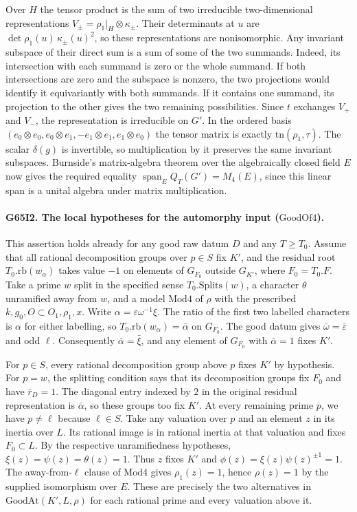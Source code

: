 Over $H$ the tensor product is the sum of two irreducible
two-dimensional representations $V_\pm=\rho_1|_H\otimes\kappa_\pm$.
Their determinants at $u$ are $\det\rho_1(u)\,\kappa_\pm(u)^2$,
so these representations are nonisomorphic. Any invariant subspace of
their direct sum is a sum of some of the two summands. Indeed, its
intersection with each summand is zero or the whole summand. If both
intersections are zero and the subspace is nonzero, the two projections
would identify it equivariantly with both summands. If it contains one
summand, its projection to the other gives the two remaining possibilities.
Since $t$ exchanges $V_+$ and $V_-$, the representation is irreducible
on $G'$. In the ordered basis
$(e_0\otimes e_0,e_0\otimes e_1,-e_1\otimes e_1,e_1\otimes e_0)$
the tensor matrix is exactly $\mathrm{tn}(\rho_1,\tau)$. The scalar
$\delta(g)$ is invertible, so multiplication by it preserves the same
invariant subspaces. Burnside's matrix-algebra theorem over the
algebraically closed field $E$ now gives the required equality
$\operatorname{span}_E Q_T(G')=M_4(E)$, since this linear span is a
unital algebra under matrix multiplication.

\paragraph{G65I2. The local hypotheses for the automorphy input ($\mathrm{GoodOf4}$).}
This assertion holds already for any good raw datum $D$ and any
$T\ge T_0$. Assume that all rational decomposition
groups over $p\in S$ fix $K'$, and the residual root $T_0.\mathrm{rb}(w_\alpha)$
takes value $-1$ on elements of $G_{F_0}$ outside $G_{K'}$,
where $F_0=T_0.F$. Take a prime $w$ split in the specified sense
$T_0.\mathrm{Splits}(w)$, a character $\theta$ unramified away from
$w$, and a model $\mathrm{Mod4}$ of $\rho$ with the prescribed
$k,g_0,O\subset O_1,\rho_1,x$. Write
$\alpha=\varepsilon\omega^{-1}\xi$. The ratio of the first two
labelled characters is $\alpha$ for either labelling, so
$T_0.\mathrm{rb}(w_\alpha)=\bar\alpha$ on $G_{F_0}$.
The good datum gives $\bar\omega=\bar\varepsilon$ and odd $\ell$.
Consequently $\bar\alpha=\bar\xi$, and any element of $G_{F_0}$
with $\bar\alpha=1$ fixes $K'$.

For $p\in S$, every rational decomposition group above $p$ fixes $K'$
by hypothesis. For $p=w$, the splitting condition says that its
decomposition groups fix $F_0$ and have $\bar r_D=1$. The diagonal
entry indexed by $2$ in the original residual representation is
$\bar\alpha$, so these groups too fix $K'$. At every remaining prime
$p$, we have $p\ne\ell$ because $\ell\in S$. Take any valuation over
$p$ and an element $z$ in its inertia over $L$. Its rational image is
in rational inertia at that valuation and fixes $F_0\subset L$. By
the respective unramifiedness hypotheses,
$\xi(z)=\psi(z)=\theta(z)=1$. Thus $z$ fixes $K'$ and
$\phi(z)=\xi(z)\psi(z)^{\pm1}=1$. The away-from-$\ell$ clause of
$\mathrm{Mod4}$ gives $\rho_1(z)=1$, hence $\rho(z)=1$ by the supplied
isomorphism over $E$. These are precisely the two alternatives in
$\mathrm{GoodAt}(K',L,\rho)$ for each rational prime and every
valuation above it.

